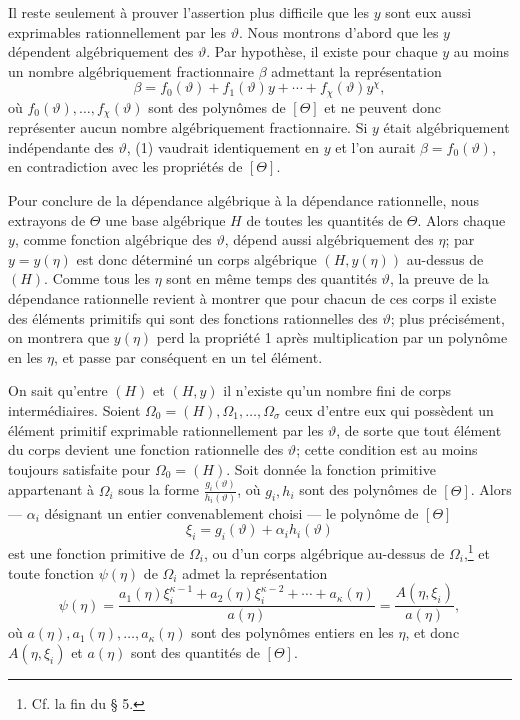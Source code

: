 Il reste seulement à prouver l'assertion plus difficile que les $y$ sont eux aussi exprimables rationnellement par les $\vartheta$. Nous montrons d'abord que les $y$ dépendent algébriquement des $\vartheta$. Par hypothèse, il existe pour chaque $y$ au moins un nombre algébriquement fractionnaire $\beta$ admettant la représentation
\begin{equation}
\beta=f_0(\vartheta)+f_1(\vartheta)y+\cdots+f_\chi(\vartheta)y^\chi,
\tag{1}
\end{equation}
où $f_0(\vartheta),\ldots,f_\chi(\vartheta)$ sont des polynômes de $[\Theta]$ et ne peuvent donc représenter aucun nombre algébriquement fractionnaire. Si $y$ était algébriquement indépendante des $\vartheta$, (1) vaudrait identiquement en $y$ et l'on aurait $\beta=f_0(\vartheta)$, en contradiction avec les propriétés de $[\Theta]$.

Pour conclure de la dépendance algébrique à la dépendance rationnelle, nous extrayons de $\Theta$ une base algébrique $H$ de toutes les quantités de $\Theta$. Alors chaque $y$, comme fonction algébrique des $\vartheta$, dépend aussi algébriquement des $\eta$; par $y=y(\eta)$ est donc déterminé un corps algébrique $(H,y(\eta))$ au-dessus de $(H)$. Comme tous les $\eta$ sont en même temps des quantités $\vartheta$, la preuve de la dépendance rationnelle revient à montrer que pour chacun de ces corps il existe des éléments primitifs qui sont des fonctions rationnelles des $\vartheta$; plus précisément, on montrera que $y(\eta)$ perd la propriété 1 après multiplication par un polynôme en les $\eta$, et passe par conséquent en un tel élément.

On sait qu'entre $(H)$ et $(H,y)$ il n'existe qu'un nombre fini de corps intermédiaires. Soient $\Omega_0=(H),\Omega_1,\ldots,\Omega_\sigma$ ceux d'entre eux qui possèdent un élément primitif exprimable rationnellement par les $\vartheta$, de sorte que tout élément du corps devient une fonction rationnelle des $\vartheta$; cette condition est au moins toujours satisfaite pour $\Omega_0=(H)$. Soit donnée la fonction primitive appartenant à $\Omega_i$ sous la forme $\frac{g_i(\vartheta)}{h_i(\vartheta)}$, où $g_i,h_i$ sont des polynômes de $[\Theta]$. Alors --- $\alpha_i$ désignant un entier convenablement choisi --- le polynôme de $[\Theta]$
\[
 \xi_i=g_i(\vartheta)+\alpha_i h_i(\vartheta)
\]
est une fonction primitive de $\Omega_i$, ou d'un corps algébrique au-dessus de $\Omega_i$,\footnote{Cf. la fin du \S{} 5.} et toute fonction $\psi(\eta)$ de $\Omega_i$ admet la représentation
\begin{equation}
\psi(\eta)=
\frac{a_1(\eta)\xi_i^{\kappa-1}+a_2(\eta)\xi_i^{\kappa-2}+\cdots+a_\kappa(\eta)}
     {a(\eta)}
=\frac{A(\eta,\xi_i)}{a(\eta)},
\tag{2}
\end{equation}
où $a(\eta),a_1(\eta),\ldots,a_\kappa(\eta)$ sont des polynômes entiers en les $\eta$, et donc $A(\eta,\xi_i)$ et $a(\eta)$ sont des quantités de $[\Theta]$.

